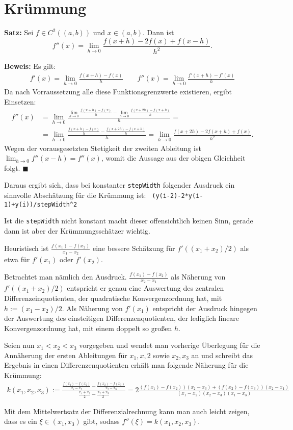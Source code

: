 \documentclass[a4paper]{article}
\theoremstyle{definition}
\begin{document}
\section{Krümmung}
\textbf{Satz:} Sei $f \in C^2((a,b))$ und $x \in (a,b)$. Dann ist 
\[
f''(x) = \lim_{h \to 0} \frac{f(x+h) -2f(x) + f(x-h)}{h^2}.
\]

\textbf{Beweis:}
Es gilt:
\begin{align*}
f'(x) = \lim_{h \to 0} \frac{f(x+h)-f(x)}{h} \qquad  f''(x) = \lim_{h \to 0} \frac{f'(x+h)-f'(x)}{h}
\end{align*}
Da nach Vorraussetzung alle diese Funktionsgrenzwerte existieren, ergibt Einsetzen:
\begin{align*}
f''(x) &= \lim_{h \to 0} \frac{\lim_{h \to 0} \frac{f(x+h)-f(x)}{h}-\lim_{h \to 0} \frac{f(x+2h)-f(x+h)}{h}}{h} = \\
&=\lim_{h \to 0}  \frac{\frac{f(x+h)-f(x)}{h}- \frac{f(x+2h)-f(x+h)}{h}}{h} = \lim_{h \to 0} \frac{f(x+2h) -2f(x+h) + f(x)}{h^2}.
\end{align*}
Wegen der vorausgesetzten Stetigkeit der zweiten Ableitung ist $\lim_{h \to 0} f''(x-h)=f''(x)$, womit die Aussage aus der obigen Gleichheit folgt. \hfill $\blacksquare$

Daraus ergibt sich, dass bei konstanter \texttt{stepWidth} folgender Ausdruck ein sinnvolle Abschätzung für die Krümmung ist:
\verb| (y(i-2)-2*y(i-1)+y(i))/stepWidth^2 |

Ist die \texttt{stepWidth} nicht konstant macht dieser offensichtlich keinen Sinn, gerade dann ist aber der Krümmungsschätzer wichtig.

Heuristisch ist $\frac{f(x_1)-f(x_2)}{x_1-x_2}$ eine bessere Schätzung für $f'((x_1+x_2)/2)$ als etwa für $f'(x_1)$ oder $f'(x_2)$. 

Betrachtet man nämlich den Ausdruck. $\frac{f(x_1)-f(x_2)}{x_2-x_1}$  als Näherung von  $f'((x_1+x_2)/2)$ entspricht er genau eine Auswertung des zentralen Differenzeinquotienten, der quadratische Konvergenzordnung hat, mit $h:= (x_1-x_2)/2$. Als Näherung von $f'(x_1)$ entspricht der Ausdruck hingegen der Auswertung des einsteitigen Differenzenquotienten, der lediglich lineare Konvergenzordnung hat, mit einem doppelt so großen $h$.

Seien nun $x_1 < x_2 < x_3$ vorgegeben und wendet man vorherige Überlegung für die Annäherung der ersten Ableitungen für $x_1, x,2$ sowie $x_2,x_3$ an und schreibt das Ergebnis in einen Differenzenquotienten erhält man folgende Näherung für die Krümmung:
\begin{align*}
k(x_1,x_2,x_3) :=  \frac{\frac{f(x_1)-f(x_2)}{x_1-x_2} - \frac{f(x_2)-f(x_3)}{x_2-x_3}}{\frac{x_1+x_2}{2} - \frac{x_2+x_3}{2}  } 
=
2 \frac{(f(x_1)-f(x_2))(x_2-x_3) + (f(x_2)-f(x_3))(x_2-x_1)}{(x_1-x_2)(x_2-x_3)(x_1-x_3)}
\end{align*}

Mit dem Mittelwertsatz der Differenzialrechnung kann man auch leicht zeigen, dass es ein $\xi \in (x_1,x_3)$ gibt, sodass $f''(\xi) = k(x_1,x_2,x_3)$. 
\end{document}
